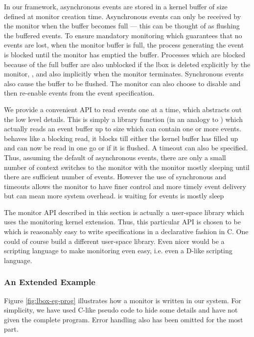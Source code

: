 In our framework, asynchronous events are stored in a kernel buffer
of size  defined at monitor creation time. Asynchronous events
can only be received by the monitor when the buffer becomes full --- this
can be thought of as flushing the buffered events.
To ensure mandatory monitoring which guarantees that no events are lost, 
when the monitor buffer is full, the process generating the event 
is blocked until the monitor has emptied the buffer.
Processes which are blocked because of the full buffer are also unblocked
if the lbox is deleted explicitly by the monitor, ,
and also implicitly when the monitor terminates.
Synchronous events also cause the buffer to be flushed.
The monitor can also choose to disable and then re-enable events from
the event specification. 

We provide a convenient API to read events one at a time,
 which abstracts out the low level details.
This is simply a library function (in an analogy to ) which
actually reads an event buffer up to size  which can
contain one or more events. 
 behaves like a blocking read, it blocks
till either the kernel buffer has filled up and can now be read
in one go or if it is flushed. A timeout can also be specified.
Thus, assuming the default of asynchronous events, there are only a small
number of context switches to the monitor with the monitor mostly sleeping
until there are sufficient number of events. However the use of synchronous
and timeouts allows the monitor to have finer control and more timely
event delivery but can mean more system overhead.
is waiting for events is mostly sleep

The monitor API described in this section is actually a user-space library
which uses the monitoring kernel extension. Thus, this particular
API is chosen to be which is reasonably easy to write specifications
in a declarative fashion in C.
One could of course build a different user-space library.
Even nicer would be a scripting language to make monitoring even easy,
i.e. even a D-like scripting language.

\subsubsection{An Extended Example}
\label{sec:lbox-eg}

Figure \ref{fig:lbox-eg-prog} illustrates how a monitor is written in our system.
For simplicity, we have used C-like pseudo code to
hide some details and have not given the complete program.
Error handling also has been omitted for the most part.

